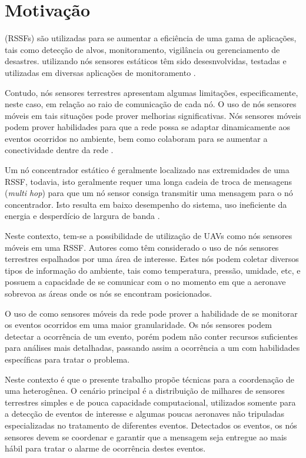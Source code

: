 
\section{Motivação}
\wsn (RSSFs) são utilizadas para se aumentar a eficiência de uma gama de aplicações, tais como detecção de alvos, monitoramento, vigilância ou gerenciamento de desastres. \rssfs utilizando nós sensores estáticos têm sido desesnvolvidas, testadas e utilizadas em diversas aplicações de monitoramento \cite{Mainwaring2002}.

Contudo, nós sensores terrestres apresentam algumas limitações, especificamente, neste caso, em relação ao raio de comunicação de cada nó. O uso de nós sensores móveis em tais situações pode prover melhorias significativas. Nós sensores móveis podem prover habilidades para que a rede possa se adaptar dinamicamente aos eventos ocorridos no ambiente, bem como colaboram para se aumentar a conectividade dentre da rede  \cite{Aware}.

Um nó concentrador estático é geralmente localizado nas extremidades de uma RSSF, todavia, isto geralmente requer uma longa cadeia de troca de mensagens (\emph{multi hop}) para que um nó sensor consiga transmitir uma mensagem para o nó concentrador. Isto resulta em baixo desempenho do sistema, uso ineficiente da energia e desperdício de largura de banda \cite{Chang2007}.

Neste contexto, tem-se a possibilidade de utilização de UAVs como nós sensores móveis em uma RSSF. Autores como \cite{Lucchi2007} têm considerado o uso de nós sensores terrestres espalhados por uma área de interesse. Estes nós podem coletar diversos tipos de informação do ambiente, tais como temperatura, pressão, umidade, etc, e possuem a capacidade de se comunicar com o \vant no momento em que a aeronave sobrevoa as áreas onde os nós se encontram posicionados.

O uso de \vants como sensores móveis da rede pode prover a habilidade de se monitorar os eventos ocorridos em uma maior granularidade. Os nós sensores podem detectar a ocorrência de um evento, porém podem não conter recursos suficientes para análises mais detalhadas, passando assim a ocorrência a um \vant com habilidades específicas para tratar o problema.

Neste contexto é que o presente trabalho propõe técnicas para a coordenação de uma \rssf heterogênea. O cenário principal é a distribuição de milhares de sensores terrestres simples e de pouca capacidade computacional, utilizados somente para a detecção de eventos de interesse e algumas poucas aeronaves não tripuladas especializadas no tratamento de diferentes eventos. Detectados os eventos, os nós sensores devem se coordenar e garantir que a mensagem seja entregue ao \vant mais hábil para tratar o alarme de ocorrência destes eventos.


